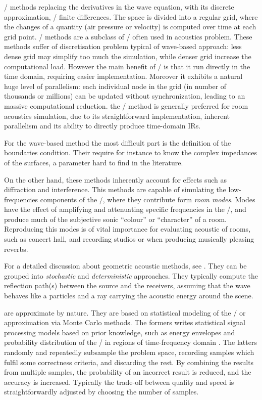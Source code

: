 \FDTDf/ methods replacing the derivatives in the wave equation, with its discrete approximation, \ie/ finite differences.
The space is divided into a regular grid, where the changes of a quantity (air pressure or velocity) is computed over time at each grid point.
\DWMf/ methods are a subclass of \FDTD/ often used in acoustics problem.
These methods suffer of discretisation problem typical of wave-based approach:
less dense grid may simplify too much the simulation, while denser grid increase the computational load.
However the main benefit of \FDTD/ is that it run directly in the time domain, requiring easier implementation.
Moreover it exhibits a natural huge level of parallelism: each individual node in the grid (in number of thousands or millions) can be updated without synchronization, leading to an massive computational reduction.
the \FDTD/ method is generally preferred for room acoustics simulation\cite{Valimaki2012fifty},
due to its straightforward implementation, inherent parallelism and its ability to directly produce time-domain IRs.

For the wave-based method the most difficult part is the definition of the boundaries condition.
Their require for instance to know the complex impedances of the surfaces, a parameter hard to find in the literature.

On the other hand, these methods inherently account for effects such as diffraction and interference.
This methods are capable of simulating the low-frequencies components of the \RIR/, where they contribute form \textit{room modes}.
Modes have the effect of amplifying and attenuating specific frequencies in the \RIR/, and produce much of the subjective sonic “colour” or “character” of a room.
Reproducing this modes is of vital importance for evaluating acoustic of rooms, such as concert hall, and recording studios or when producing musically pleasing reverbs.


For a detailed discussion about geometric acoustic methods, see \cite{Savioja2015goemetric}.
They can be grouped into \textit{stochastic} and \textit{deterministic} approaches.
They typically compute the reflection path(s) between the source and the receivers,
assuming that the wave behaves like a particles and a ray carrying the acoustic energy around the scene.

 are approximate by nature.
They are based on statistical modeling of the \RIRs/ or approximation via Monte Carlo methods.
The formers writes statistical signal processing models based on prior knowledge,
such as energy envelopes and probability distribution of the \RIR/ in regions of time-frequency domain  \cite{Badeau2019common}.
The latters randomly and repeatedly subsample the problem space, recording samples which fulfil some correctness criteria, and discarding the rest.
By combining the results from multiple samples, the probability of an incorrect result is reduced, and the accuracy is increased.
Typically the trade-off between quality and speed is straightforwardly adjusted by choosing the number of samples.

